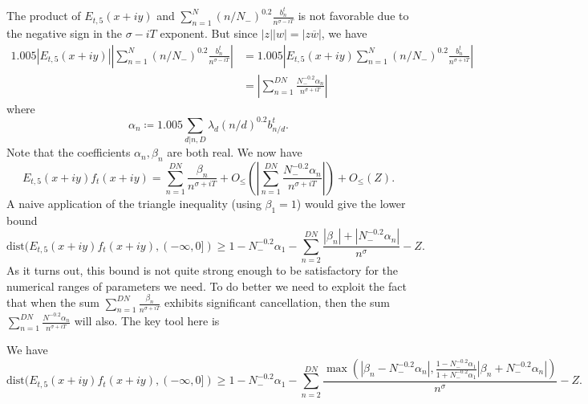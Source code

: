 The product of $E_{t,5}(x+iy)$ and $\sum_{n=1}^N (n/N_-)^{0.2} \frac{b_n^t}{n^{\sigma-iT}}$ is not favorable due to the negative sign in the $\sigma-iT$ exponent.  But since $|z| |w| = |z \overline{w}|$, we have
\begin{align*}
1.005 |E_{t,5}(x+iy)| \left|\sum_{n=1}^N (n/N_-)^{0.2} \frac{b_n^t}{n^{\sigma-iT}}\right|  &=
1.005 \left|E_{t,5}(x+iy) \sum_{n=1}^N (n/N_-)^{0.2} \frac{b_n^t}{n^{\sigma+iT}}\right|  \\
&= \left|\sum_{n=1}^{DN} \frac{N_-^{-0.2} \alpha_{n}}{n^{\sigma+iT}}\right|
\end{align*}
where
$$ \alpha_{n} \coloneqq 1.005 \sum_{d|n,D} \lambda_d (n/d)^{0.2} b_{n/d}^t.$$
Note that the coefficients $\alpha_{n}, \beta_n$ are both real.  We now have
\begin{equation}\label{ets}
 E_{t,5}(x+iy) f_t(x+iy) = \sum_{n=1}^{DN} \frac{\beta_n}{n^{\sigma+iT}} + O_{\leq}\left( \left|\sum_{n=1}^{DN} \frac{N_-^{-0.2} \alpha_{n}}{n^{\sigma+iT}}\right| \right) + O_{\leq}(Z).
\end{equation}
A naive application of the triangle inequality (using $\beta_1=1$) would give the lower bound
\begin{equation}\label{eft}
 \mathrm{dist}(E_{t,5}(x+iy) f_t(x+iy), (-\infty,0]) \geq 1 - N_-^{-0.2} \alpha_{1} - \sum_{n=2}^{DN} \frac{|\beta_n| + |N_-^{-0.2} \alpha_{n}|}{n^{\sigma}} - Z.
\end{equation}
As it turns out, this bound is not quite strong enough to be satisfactory for the numerical ranges of parameters we need.  To do better we need to exploit the fact that when the sum $\sum_{n=1}^{DN} \frac{\beta_n}{n^{\sigma+iT}}$ exhibits significant cancellation, then the sum $\sum_{n=1}^{DN} \frac{N^{-0.2} \alpha_{n}}{n^{\sigma+iT}}$ will also. The key tool here is

\begin{lemma}  We have
$$ \mathrm{dist}(E_{t,5}(x+iy) f_t(x+iy), (-\infty,0]) \geq 1 - N_-^{-0.2} \alpha_{1} - \sum_{n=2}^{DN} \frac{\max(|\beta_n-N_-^{-0.2} \alpha_{n}|, \frac{1-N_-^{-0.2} \alpha_{1}}{1+N_-^{-0.2} \alpha_{1}} |\beta_n+N_-^{-0.2} \alpha_{n}|)}{n^{\sigma}} - Z.$$
\end{lemma}

